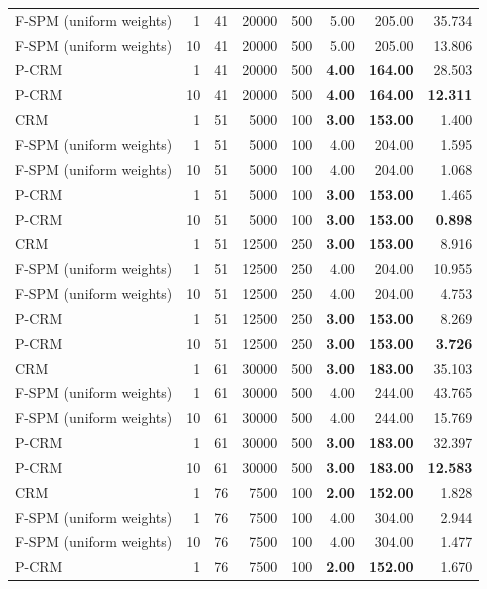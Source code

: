 \begin{tabular}{lrrrrrrr}
F-SPM (uniform weights) & 1 & 41 & 20000 & 500 & 5.00 & 205.00 & 35.734 \\
F-SPM (uniform weights) & 10 & 41 & 20000 & 500 & 5.00 & 205.00 & 13.806 \\
P-CRM & 1 & 41 & 20000 & 500 & \textbf{4.00} & \textbf{164.00} & 28.503 \\
P-CRM & 10 & 41 & 20000 & 500 & \textbf{4.00} & \textbf{164.00} & \textbf{12.311} \\
\midrule
CRM & 1 & 51 & 5000 & 100 & \textbf{3.00} & \textbf{153.00} & 1.400 \\
F-SPM (uniform weights) & 1 & 51 & 5000 & 100 & 4.00 & 204.00 & 1.595 \\
F-SPM (uniform weights) & 10 & 51 & 5000 & 100 & 4.00 & 204.00 & 1.068 \\
P-CRM & 1 & 51 & 5000 & 100 & \textbf{3.00} & \textbf{153.00} & 1.465 \\
P-CRM & 10 & 51 & 5000 & 100 & \textbf{3.00} & \textbf{153.00} & \textbf{0.898} \\
\midrule
CRM & 1 & 51 & 12500 & 250 & \textbf{3.00} & \textbf{153.00} & 8.916 \\
F-SPM (uniform weights) & 1 & 51 & 12500 & 250 & 4.00 & 204.00 & 10.955 \\
F-SPM (uniform weights) & 10 & 51 & 12500 & 250 & 4.00 & 204.00 & 4.753 \\
P-CRM & 1 & 51 & 12500 & 250 & \textbf{3.00} & \textbf{153.00} & 8.269 \\
P-CRM & 10 & 51 & 12500 & 250 & \textbf{3.00} & \textbf{153.00} & \textbf{3.726} \\
\midrule
CRM & 1 & 61 & 30000 & 500 & \textbf{3.00} & \textbf{183.00} & 35.103 \\
F-SPM (uniform weights) & 1 & 61 & 30000 & 500 & 4.00 & 244.00 & 43.765 \\
F-SPM (uniform weights) & 10 & 61 & 30000 & 500 & 4.00 & 244.00 & 15.769 \\
P-CRM & 1 & 61 & 30000 & 500 & \textbf{3.00} & \textbf{183.00} & 32.397 \\
P-CRM & 10 & 61 & 30000 & 500 & \textbf{3.00} & \textbf{183.00} & \textbf{12.583} \\
\midrule
CRM & 1 & 76 & 7500 & 100 & \textbf{2.00} & \textbf{152.00} & 1.828 \\
F-SPM (uniform weights) & 1 & 76 & 7500 & 100 & 4.00 & 304.00 & 2.944 \\
F-SPM (uniform weights) & 10 & 76 & 7500 & 100 & 4.00 & 304.00 & 1.477 \\
P-CRM & 1 & 76 & 7500 & 100 & \textbf{2.00} & \textbf{152.00} & 1.670 \\

\end{tabular}
